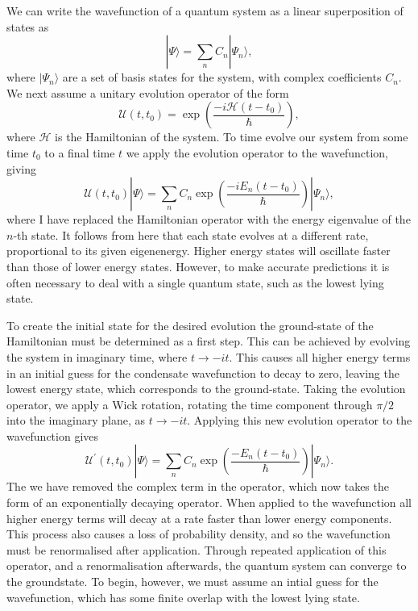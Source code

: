We can write the wavefunction of a quantum system as a linear superposition of states as
\begin{equation}
     |\Psi \rangle = \displaystyle\sum\limits_{n} C_n |\Psi_n \rangle,
\end{equation}
where $| \Psi_n \rangle$ are a set of basis states for the system, with complex coefficients $C_n$. We next assume a unitary evolution operator of the form
\begin{equation}
    \mathscr{U}(t,t_0) = \exp\left(\frac{-i\mathcal{H}(t-t_0)}{\hbar}\right),
\end{equation}
where $\mathcal{H}$ is the Hamiltonian of the system. To time evolve our system from some time $t_0$ to a final time $t$ we apply the evolution operator to the wavefunction, giving
\begin{equation}
    \mathscr{U}(t,t_0)|\Psi \rangle = \displaystyle\sum\limits_{n} C_n \exp\left(\frac{-i{E_n}(t-t_0)}{\hbar}\right)|\Psi_n \rangle,
\end{equation}
where I have replaced the Hamiltonian operator with the energy eigenvalue of the $n$-th state. It follows from here that each state evolves at a different rate, proportional to its given eigenenergy. Higher energy states will oscillate faster than those of lower energy states. However, to make accurate predictions it is often necessary to deal with a single quantum state, such as the lowest lying state.

To create the initial state for the desired evolution the ground-state of the Hamiltonian must be determined as a first step. This can be achieved by evolving the system in imaginary time, where $t\rightarrow -it$. This causes all higher energy terms in an initial guess for the condensate wavefunction to decay to zero, leaving the lowest energy state, which corresponds to the ground-state. Taking the evolution operator, we apply a Wick rotation, rotating the time component through $\pi/2$ into the imaginary plane, as $t \rightarrow -it$. Applying this new evolution operator to the wavefunction gives
\begin{equation}
        \mathscr{U^{'}}(t,t_0)|\Psi \rangle = \displaystyle\sum\limits_{n} C_n \exp\left(\frac{-{E_n}(t-t_0)}{\hbar}\right)|\Psi_n \rangle.
\end{equation}
The we have removed the complex term in the operator, which now takes the form of an exponentially decaying operator. When applied to the wavefunction all higher energy terms will decay at a rate faster than lower energy components. This process also causes a loss of probability density, and so the wavefunction must be renormalised after application. Through repeated application of this operator, and a renormalisation afterwards, the quantum system can converge to the groundstate. To begin, however, we must assume an intial guess for the wavefunction, which has some finite overlap with the lowest lying state.


